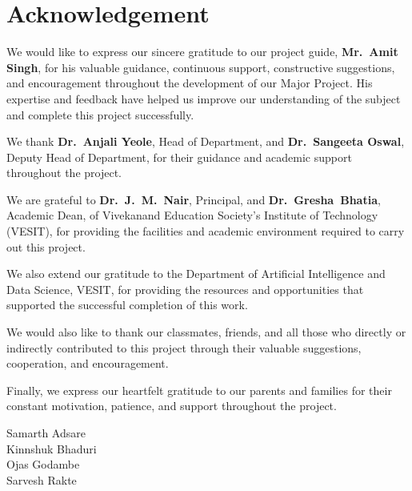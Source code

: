 \chapter*{Acknowledgement}

We would like to express our sincere gratitude to our project guide,
\textbf{Mr.\ Amit Singh}, for his valuable guidance, continuous
support, constructive suggestions, and encouragement throughout the
development of our Major Project. His expertise and feedback have
helped us improve our understanding of the subject and complete this
project successfully.

We thank \textbf{Dr.\ Anjali Yeole}, Head of Department, and
\textbf{Dr.\ Sangeeta Oswal}, Deputy Head of Department, for their
guidance and academic support throughout the project.

We are grateful to \textbf{Dr.\ J.\ M.\ Nair}, Principal, and
\mbox{\textbf{Dr.\ Gresha Bhatia}}, Academic Dean, of Vivekanand Education
Society's Institute of Technology (VESIT), for providing the
facilities and academic environment required to carry out this
project.

We also extend our gratitude to the Department of Artificial
Intelligence and Data Science, VESIT, for providing the resources and
opportunities that supported the successful completion of this work.

We would also like to thank our classmates, friends, and all those who
directly or indirectly contributed to this project through their
valuable suggestions, cooperation, and encouragement.

Finally, we express our heartfelt gratitude to our parents and
families for their constant motivation, patience, and support
throughout the project.

\vspace{1cm}

\begin{flushright}
Samarth Adsare\\
Kinnshuk Bhaduri\\
Ojas Godambe\\
Sarvesh Rakte
\end{flushright}
